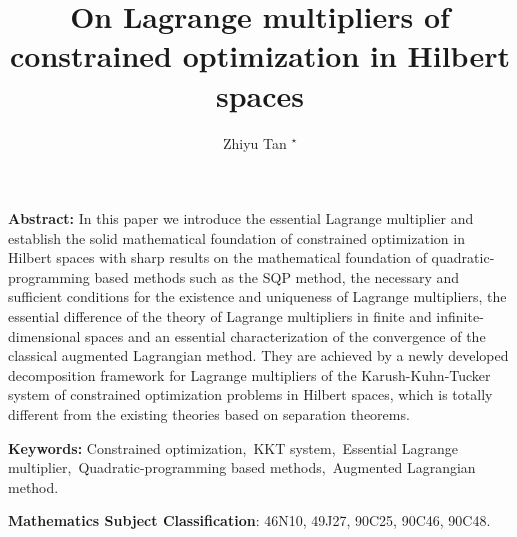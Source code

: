 \documentclass[leqno]{amsart}
\title{ On Lagrange multipliers of constrained optimization in Hilbert spaces}
\author{Zhiyu Tan $^\star$}
\theoremstyle{definition}
\begin{document}
\maketitle

{\bf Abstract:}\hspace*{10pt} {In this paper we introduce the essential Lagrange multiplier and establish the solid mathematical foundation of constrained optimization in Hilbert spaces with sharp results on the mathematical foundation of quadratic-programming based methods such as the SQP method, the  necessary and sufficient conditions for the existence and uniqueness of Lagrange multipliers, the essential difference of the theory of Lagrange multipliers in finite and infinite-dimensional spaces and an essential characterization of the convergence of the classical augmented Lagrangian method. They are achieved by a newly developed decomposition framework for Lagrange multipliers of the Karush-Kuhn-Tucker system of constrained optimization problems in Hilbert spaces, which is totally different from the existing theories based on separation theorems.}%

{{\bf Keywords:}\hspace*{10pt}  Constrained optimization,\ KKT system,\ Essential Lagrange multiplier,\ Quadratic-programming based methods,\ Augmented Lagrangian method.}
\vspace{8pt}

\textbf{Mathematics Subject Classification}: 46N10, 49J27, 90C25, 90C46, 90C48.

\end{document}
